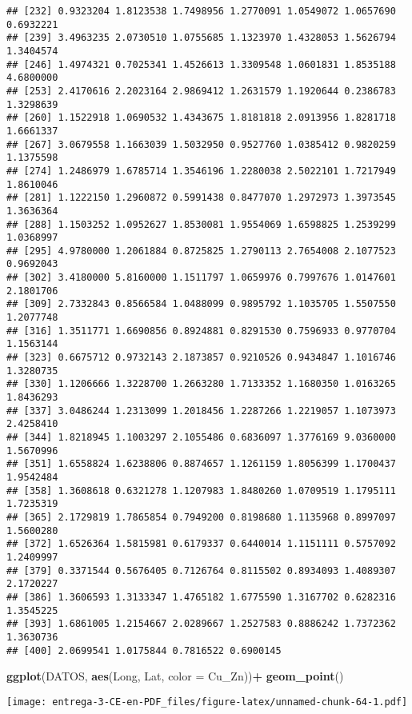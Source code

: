 \documentclass[
]{article}
\newenvironment{Shaded}{\begin{snugshade}}{\end{snugshade}}
\newcommand{\DataTypeTok}[1]{\textcolor[rgb]{0.13,0.29,0.53}{#1}}
\newcommand{\KeywordTok}[1]{\textcolor[rgb]{0.13,0.29,0.53}{\textbf{#1}}}
\newcommand{\NormalTok}[1]{#1}
\newcommand{\OperatorTok}[1]{\textcolor[rgb]{0.81,0.36,0.00}{\textbf{#1}}}
\newcommand{\StringTok}[1]{\textcolor[rgb]{0.31,0.60,0.02}{#1}}
\begin{document}
\begin{verbatim}
## [232] 0.9323204 1.8123538 1.7498956 1.2770091 1.0549072 1.0657690 0.6932221
## [239] 3.4963235 2.0730510 1.0755685 1.1323970 1.4328053 1.5626794 1.3404574
## [246] 1.4974321 0.7025341 1.4526613 1.3309548 1.0601831 1.8535188 4.6800000
## [253] 2.4170616 2.2023164 2.9869412 1.2631579 1.1920644 0.2386783 1.3298639
## [260] 1.1522918 1.0690532 1.4343675 1.8181818 2.0913956 1.8281718 1.6661337
## [267] 3.0679558 1.1663039 1.5032950 0.9527760 1.0385412 0.9820259 1.1375598
## [274] 1.2486979 1.6785714 1.3546196 1.2280038 2.5022101 1.7217949 1.8610046
## [281] 1.1222150 1.2960872 0.5991438 0.8477070 1.2972973 1.3973545 1.3636364
## [288] 1.1503252 1.0952627 1.8530081 1.9554069 1.6598825 1.2539299 1.0368997
## [295] 4.9780000 1.2061884 0.8725825 1.2790113 2.7654008 2.1077523 0.9692043
## [302] 3.4180000 5.8160000 1.1511797 1.0659976 0.7997676 1.0147601 2.1801706
## [309] 2.7332843 0.8566584 1.0488099 0.9895792 1.1035705 1.5507550 1.2077748
## [316] 1.3511771 1.6690856 0.8924881 0.8291530 0.7596933 0.9770704 1.1563144
## [323] 0.6675712 0.9732143 2.1873857 0.9210526 0.9434847 1.1016746 1.3280735
## [330] 1.1206666 1.3228700 1.2663280 1.7133352 1.1680350 1.0163265 1.8436293
## [337] 3.0486244 1.2313099 1.2018456 1.2287266 1.2219057 1.1073973 2.4258410
## [344] 1.8218945 1.1003297 2.1055486 0.6836097 1.3776169 9.0360000 1.5670996
## [351] 1.6558824 1.6238806 0.8874657 1.1261159 1.8056399 1.1700437 1.9542484
## [358] 1.3608618 0.6321278 1.1207983 1.8480260 1.0709519 1.1795111 1.7235319
## [365] 2.1729819 1.7865854 0.7949200 0.8198680 1.1135968 0.8997097 1.5600280
## [372] 1.6526364 1.5815981 0.6179337 0.6440014 1.1151111 0.5757092 1.2409997
## [379] 0.3371544 0.5676405 0.7126764 0.8115502 0.8934093 1.4089307 2.1720227
## [386] 1.3606593 1.3133347 1.4765182 1.6775590 1.3167702 0.6282316 1.3545225
## [393] 1.6861005 1.2154667 2.0289667 1.2527583 0.8886242 1.7372362 1.3630736
## [400] 2.0699541 1.0175844 0.7816522 0.6900145
\end{verbatim}

\begin{Shaded}
\begin{Highlighting}[]
\KeywordTok{ggplot}\NormalTok{(DATOS, }\KeywordTok{aes}\NormalTok{(Long, Lat, }\DataTypeTok{color =}\NormalTok{ Cu_Zn))}\OperatorTok{+}
\StringTok{  }\KeywordTok{geom_point}\NormalTok{()}
\end{Highlighting}
\end{Shaded}

\texttt{[image: entrega-3-CE-en-PDF\_files/figure-latex/unnamed-chunk-64-1.pdf]}
\end{document}
